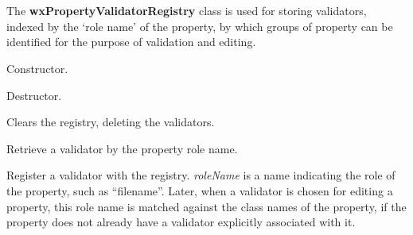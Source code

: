 \section{}\label{wxpropertyvalidatorregistry}

The {\bf wxPropertyValidatorRegistry} class is used for storing validators,
indexed by the `role name' of the property, by which groups of property
can be identified for the purpose of validation and editing.




Constructor.



Destructor.



Clears the registry, deleting the validators.



Retrieve a validator by the property role name.

\label{wxpropertyvalidatorregistervalidator}


Register a validator with the registry. {\it roleName} is a name indicating the
role of the property, such as ``filename''. Later, when a validator is chosen for
editing a property, this role name is matched against the class names of the property,
if the property does not already have a validator explicitly associated with it.



